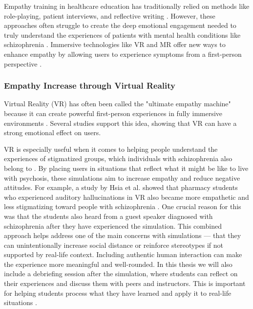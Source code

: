 Empathy training in healthcare education has traditionally relied on methods like role-playing, patient interviews, and reflective writing \cite{Batt-Rawden2013}. However, these approaches often struggle to create the deep emotional engagement needed to truly understand the experiences of patients with mental health conditions like schizophrenia \cite{Hsia2022, Formosa2018}. Immersive technologies like VR and MR offer new ways to enhance empathy by allowing users to experience symptoms from a first-person perspective \cite{Krogmeier2024, Silva2017}.

\subsubsection{Empathy Increase through Virtual Reality}

Virtual Reality (VR) has often been called the "ultimate empathy machine" because it can create powerful first-person experiences in fully immersive environments \cite{Milk2015}. Several studies support this idea, showing that VR can have a strong emotional effect on users.

VR is especially useful when it comes to helping people understand the experiences of stigmatized groups, which individuals with schizophrenia also belong to \cite{Formosa2018, Marques2022, Mattsson2024}. By placing users in situations that reflect what it might be like to live with psychosis, these simulations aim to increase empathy and reduce negative attitudes. For example, a study by Hsia et al. showed that pharmacy students who experienced auditory hallucinations in VR also became more empathetic and less stigmatizing toward people with schizophrenia \cite{Hsia2022}. One crucial reason for this was that the students also heard from a guest speaker diagnosed with schizophrenia after they have experienced the simulation. This combined approach helps address one of the main concerns with simulations — that they can unintentionally increase social distance or reinforce stereotypes if not supported by real-life context. Including authentic human interaction can make the experience more meaningful and well-rounded. In this thesis we will also include a debriefing session after the simulation, where students can reflect on their experiences and discuss them with peers and instructors. This is important for helping students process what they have learned and apply it to real-life situations \cite{Hsia2022}.

\vspace{1em}

